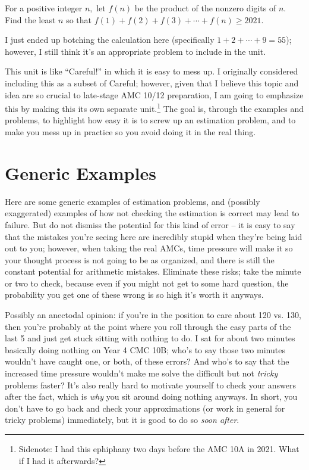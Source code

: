 \documentclass{article}
\begin{document}
\begin{exer}[CMC 10B 2021/18]
For a positive integer $n,$ let $f(n)$ be the product of the nonzero digits of $n.$ Find the least $n$ so that $f(1)+f(2)+f(3)+\cdots+f(n)\geq 2021.$

\end{exer}

I just ended up botching the calculation here (specifically $1+2+\cdots+9=55$); however, I still think it's an appropriate problem to include in the unit.

This unit is like ``Careful!'' in which it is easy to mess up. I originally considered including this as a subset of Careful; however, given that I believe this topic and idea are so crucial to late-stage AMC 10/12 preparation, I am going to emphasize this by making this its own separate unit.\footnote{Sidenote: I had this ephiphany two days before the AMC 10A in 2021. What if I had it afterwards?} The goal is, through the examples and problems, to highlight how easy it is to screw up an estimation problem, and to make you mess up in practice so you avoid doing it in the real thing.

\section{Generic Examples}

Here are some generic examples of estimation problems, and (possibly exaggerated) examples of how not checking the estimation is correct may lead to failure. But do not dismiss the potential for this kind of error -- it is easy to say that the mistakes you're seeing here are incredibly stupid when they're being laid out to you; however, when taking the real AMCs, time pressure will make it so your thought process is not going to be as organized, and there is still the constant potential for arithmetic mistakes. Eliminate these risks; take the minute or two to check, because even if you might not get to some hard question, the probability you get one of these wrong is so high it's worth it anyways.

\begin{remark}
Possibly an anectodal opinion: if you're in the position to care about 120 vs. 130, then you're probably at the point where you roll through the easy parts of the last 5 and just get stuck sitting with nothing to do. I sat for about two minutes basically doing nothing on Year 4 CMC 10B; who's to say those two minutes wouldn't have caught one, or both, of these errors? And who's to say that the increased time pressure wouldn't make me solve the difficult but not \textit{tricky} problems faster? It's also really hard to motivate yourself to check your answers after the fact, which is \textit{why} you sit around doing nothing anyways. In short, you don't have to go back and check your approximations (or work in general for tricky problems) immediately, but it is good to do so \textit{soon after}.
\end{remark}
\end{document}
